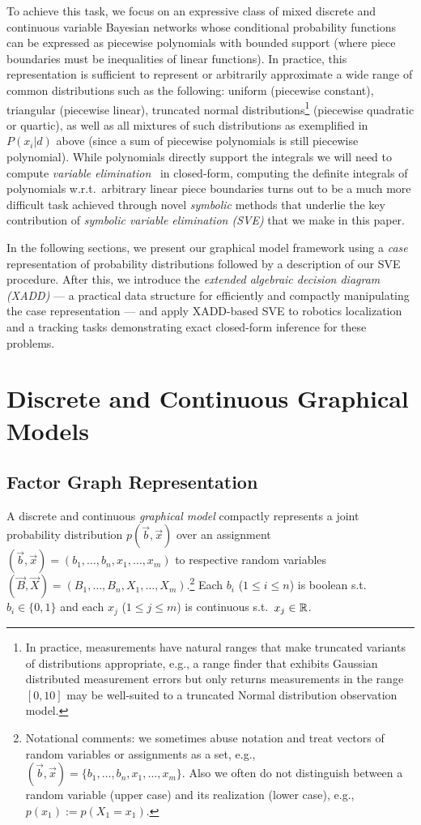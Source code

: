 \documentclass[letterpaper]{article}
\renewcommand{\-}{\text{-}}
\begin{document}
To achieve this task, we focus on an expressive class of mixed
discrete and continuous variable Bayesian networks whose conditional
probability functions can be expressed as piecewise polynomials with
bounded support (where piece boundaries must be inequalities of linear
functions).  In practice, this representation is sufficient to
represent or arbitrarily approximate a wide range of common
distributions such as the following: uniform (piecewise constant),
triangular (piecewise linear), truncated normal
distributions\footnote{In practice, measurements have natural ranges
that make truncated variants of distributions appropriate, e.g., a
range finder that exhibits Gaussian distributed measurement errors but
only returns measurements in the range $[0,10]$ may be well-suited to
a truncated Normal distribution observation model.}  (piecewise
quadratic or quartic), as well as all mixtures of such distributions
as exemplified in $P(x_i|d)$ above (since a sum of piecewise
polynomials is still piecewise polynomial).  While polynomials
directly support the integrals we will need to compute \emph{variable
elimination}~\cite{varelim} in closed-form, computing the definite
integrals of polynomials w.r.t.\ arbitrary linear piece boundaries
turns out to be a much more difficult task achieved through novel
\emph{symbolic} methods that underlie the key contribution of
\emph{symbolic variable elimination (SVE)} that we make in this paper.

In the following sections, we present our graphical model
framework using a \emph{case} representation of probability
distributions followed by a description of our SVE procedure.  
After this, we introduce
the \emph{extended algebraic decision diagram (XADD)} --- a practical
data structure for efficiently and compactly manipulating the case
representation --- and apply XADD-based SVE to robotics localization 
and a tracking tasks demonstrating exact closed-form inference 
for these problems.  

\section{Discrete and Continuous Graphical Models}

\subsection{Factor Graph Representation}

A discrete and continuous \emph{graphical model} compactly represents
a joint probability distribution $p(\vec{b},\vec{x})$ over an
assignment $(\vec{b},\vec{x}) = ( b_1,\ldots,b_n,x_{1},\ldots,x_m )$
to respective random variables $(\vec{B},\vec{X}) =
(B_1,\ldots,B_n,X_{1},\ldots,X_m )$.\footnote{Notational comments:
we sometimes abuse notation and treat
vectors of random variables or assignments as a set, e.g., 
$(\vec{b},\vec{x}) = \{ b_1,\ldots,b_n,x_1,\ldots,x_m \}$.  
Also we often do
not distinguish between a random variable (upper case) and its
realization (lower case), e.g., $p(x_1) := p(X_1 = x_1)$.}  Each $b_i$
($1 \leq i \leq n$) is boolean s.t.\ $b_i \in \{ 0,1 \}$ and each
$x_j$ ($1 \leq j \leq m$) is continuous s.t.\ $x_j \in \mathbb{R}$.
\end{document}
